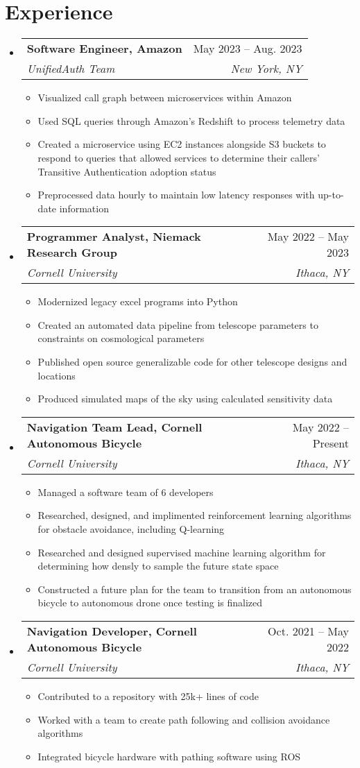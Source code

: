 \documentclass[letterpaper,11pt]{article}
\makeatletter
\newcommand{\resumeItem}[1]{
  \item\small{
    {#1 \vspace{-2pt}}
  }
}
\newcommand{\resumeSubheading}[4]{
  \vspace{-2pt}\item
    \begin{tabular*}{0.97\textwidth}[t]{l@{\extracolsep{\fill}}r}
      \textbf{#1} & #2 \\
      \textit{\small#3} & \textit{\small #4} \\
    \end{tabular*}\vspace{-7pt}
}
\newcommand{\resumeSubHeadingListStart}{\begin{itemize}[leftmargin=0.15in, label={}]}
\newcommand{\resumeSubHeadingListEnd}{\end{itemize}}
\newcommand{\resumeItemListStart}{\begin{itemize}}
\newcommand{\resumeItemListEnd}{\end{itemize}\vspace{-5pt}}
\makeatother
\begin{document}
\section{Experience}
\resumeSubHeadingListStart

\resumeSubheading{Software Engineer, Amazon}{May 2023 -- Aug. 2023}
{UnifiedAuth Team}{New York, NY}
\resumeItemListStart
\resumeItem{Visualized call graph between microservices within Amazon}
\resumeItem{Used SQL queries through Amazon's Redshift to process telemetry data}
\resumeItem{Created a microservice using EC2 instances alongside S3 buckets to respond to queries that allowed services to determine their callers' Transitive Authentication adoption status}
\resumeItem{Preprocessed data hourly to maintain low latency responses with up-to-date information}
\resumeItemListEnd

\resumeSubheading
{Programmer Analyst, Niemack Research Group}{May 2022 -- May 2023}
{Cornell University}{Ithaca, NY}
\resumeItemListStart
\resumeItem{Modernized legacy excel programs into Python}
\resumeItem{Created an automated data pipeline from telescope parameters to constraints on cosmological parameters}
\resumeItem{Published open source generalizable code for other telescope designs and locations}
\resumeItem{Produced simulated maps of the sky using calculated sensitivity data}
\resumeItemListEnd

\resumeSubheading
{Navigation Team Lead, Cornell Autonomous Bicycle}{May 2022 -- Present}
{Cornell University}{Ithaca, NY}
\resumeItemListStart
\resumeItem{Managed a software team of 6 developers}
\resumeItem{Researched, designed, and implimented reinforcement learning algorithms for obstacle avoidance, including Q-learning}
\resumeItem{Researched and designed supervised machine learning algorithm for determining how densly to sample the future state space}
\resumeItem{Constructed a future plan for the team to transition from an autonomous bicycle to autonomous drone once testing is finalized}
\resumeItemListEnd

\resumeSubheading
{Navigation Developer, Cornell Autonomous Bicycle}{Oct. 2021 -- May 2022}
{Cornell University}{Ithaca, NY}
\resumeItemListStart
\resumeItem{Contributed to a repository with 25k+ lines of code}
\resumeItem{Worked with a team to create path following and collision avoidance algorithms}
\resumeItem{Integrated bicycle hardware with pathing software using ROS}
\resumeItemListEnd

\resumeSubHeadingListEnd
\end{document}

